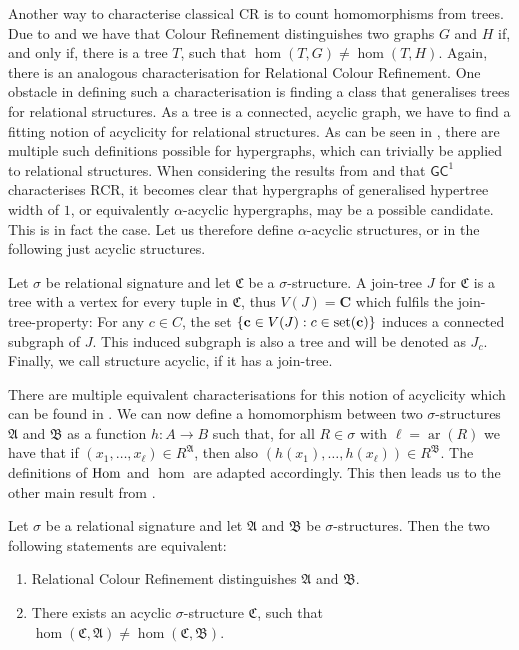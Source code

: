 Another way to characterise classical CR is to count homomorphisms from trees.
Due to \cite{dvorak2010RecognizingGraphsa} and \cite{dell2018LovaszMeets} we have that Colour Refinement distinguishes two graphs $G$ and $H$ if, and only if, there is a tree $T$, such that $\hom(T,G)\neq\hom(T,H)$.
Again, there is an analogous characterisation for Relational Colour Refinement.
One obstacle in defining such a characterisation is finding a class that generalises trees for relational structures.
As a tree is a connected, acyclic graph, we have to find a fitting notion of acyclicity for relational structures.
As can be seen in \cite{brault-baron2014HypergraphAcyclicity}, there are multiple such definitions possible for hypergraphs, which can trivially be applied to relational structures.
When considering the results from \cite{scheidt2023CountingHomomorphisms} and that $\mathsf{GC}^1$ characterises RCR, it becomes clear that hypergraphs of generalised hypertree width of $1$, or equivalently $\alpha$-acyclic hypergraphs, may be a possible candidate.
This is in fact the case.
Let us therefore define $\alpha$-acyclic structures, or in the following just acyclic structures.

\begin{definition}
	Let $\sigma$ be relational signature and let $\mathfrak C$ be a $\sigma$-structure.
	A join-tree $J$ for $\mathfrak C$ is a tree with a vertex for every tuple in $\mathfrak C$, thus $V(J)=\mathbf C$ which fulfils the join-tree-property:
	For any $c\in C$, the set $\{\mathbf c \in V(J) : c\in \operatorname{set}(\mathbf c)\}$ induces a connected subgraph of $J$.
	This induced subgraph is also a tree and will be denoted as $J_c$.
	Finally, we call structure acyclic, if it has a join-tree.
\end{definition}
There are multiple equivalent characterisations for this notion of acyclicity which can be found in \cite{brault-baron2014HypergraphAcyclicity}.
We can now define a homomorphism between two $\sigma$-structures $\mathfrak A$ and $\mathfrak B$ as a function $h:A\to B$ such that, for all $R\in \sigma$ with $\ell=\operatorname{ar}(R)$ we have that if $(x_1,\dots,x_\ell)\in R^{\mathfrak A}$, then also $(h(x_1),\dots,h(x_\ell))\in R^{\mathfrak B}$.
The definitions of $\operatorname{Hom}$ and $\hom$ are adapted accordingly.
This then leads us to the other main result from \cite{scheidt2025ColorRefinement}.

\begin{theorem}
	Let $\sigma$ be a relational signature and let $\mathfrak A$ and $\mathfrak B$ be $\sigma$-structures.
	Then the two following statements are equivalent:
	\begin{enumerate}
		\item Relational Colour Refinement distinguishes $\mathfrak A$ and $\mathfrak B$.
		\item There exists an acyclic $\sigma$-structure $\mathfrak C$, such that $\hom(\mathfrak C,\mathfrak A)\neq\hom(\mathfrak C,\mathfrak B)$.
	\end{enumerate}
\end{theorem}

